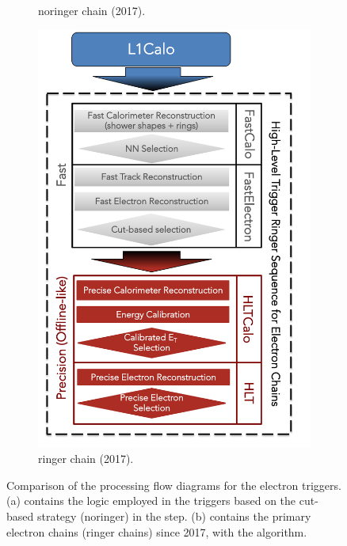\begin{figure}[h!tb]
\begin{center}
\begin{subfigure}[c]{.48\textwidth}
  \caption{noringer chain (2017).}
  \end{subfigure}
  \hfill
  \begin{subfigure}[c]{.48\textwidth}
  \centering
  \includegraphics[width=\textwidth]{sections/context/figures/ElectronChain_Run2_ringer.pdf}
  \caption{ringer chain (2017).}
  \end{subfigure}
  \caption{Comparison of the processing flow diagrams for the electron triggers. (a)
  contains the logic employed in the triggers based on the cut-based strategy
  (noringer) in the \fastcalo step. (b) contains the primary electron
  chains (ringer chains) since 2017, with the \rnn{} algorithm.}%
  \label{fig:ringer_chains}
  \end{center}
\end{figure}


